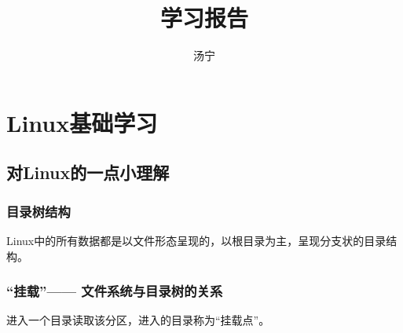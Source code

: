 \documentclass[12pt]{article}
\begin{document}
\title{\vspace{-2em}学习报告\vspace{-0.7em}}
\author{汤宁}
\date{}
\maketitle\thispagestyle{fancy}
\maketitle

\tableofcontents

\section{Linux基础学习}
\subsection{对Linux的一点小理解}
\begin{flushleft}
\subsubsection{目录树结构}
Linux中的所有数据都是以文件形态呈现的，以根目录为主，呈现分支状的目录结构。
\end{flushleft}
\subsubsection{“挂载”——{} 文件系统与目录树的关系}
\begin{flushleft}
进入一个目录读取该分区，进入的目录称为“挂载点”。
\end{flushleft}
\end{document}
